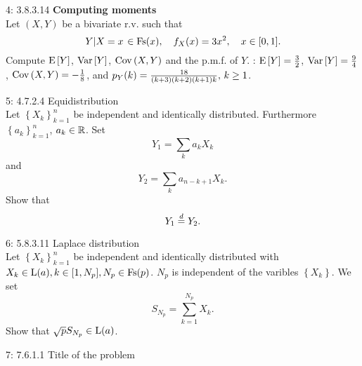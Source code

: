 \documentclass[a4paper,twoside=false,abstract=false,numbers=noenddot,
titlepage=false,headings=small,parskip=half,version=last]{scrartcl}
\begin{document}
\begin{exercise}{4: 3.8.3.14} \textbf{Computing moments} \\
    Let $(X,Y)$ be a bivariate r.v. such that
    \begin{equation}
        \left. Y \middle\vert X=x \right. \in \text{Fs}(x),\quad
        f_X(x)=3x^2,\quad
        x\in [0, 1].
    \end{equation}
    Compute ${\rm E}\,[Y]$, ${\rm Var}\,[Y]$, ${\rm Cov}\,(X, Y)$ and the p.m.f.
    of $Y$.
    \Answer:
    ${{\rm E}\,[Y]=\frac{3}{2}}$,
    ${{\rm Var}\,[Y]=\frac{9}{4}}$,
    ${{\rm Cov}\,(X,Y)=-\frac{1}{8}}$, and
    $p_{Y} (k) = \frac{18}{(k+3)(k+2)(k+1)k},\, k \ge 1$.

\end{exercise}
\begin{solution}
\end{solution}
\pagebreak

\begin{exercise}{5: 4.7.2.4} Equidistribution \\
    Let $\left\{{X_k}\right\}_{k=1}^n$ be independent and identically
    distributed. Furthermore $\left\{{a_k}\right\}_{k=1}^n$, $a_k \in \mathbb{R}$. Set
    \begin{equation}
        Y_1 = \sum\limits_k a_k X_k
    \end{equation}
    and
    \begin{equation}
        Y_2 = \sum\limits_k a_{n-k+1} X_k.
    \end{equation}
    Show that
    \begin{equation}
        Y_1 \stackrel{d}{=} Y_2.
    \end{equation}
\end{exercise}
\begin{solution}
\end{solution}
\pagebreak

\begin{exercise}{6: 5.8.3.11} Laplace distribution \\
    Let $\left\{{X_k}\right\}_{k=1}^n$ be independent and identically
    distributed with
    ${X_k \in\text{L}(a),}\, {k\in[1,N_p],}\, {N_p\in \text{Fs}(p)}$.
    $N_p$ is independent of the varibles $\left\{X_k\right\}$. We set
    \begin{equation}
        S_{N_p} = \sum\limits_{k=1}^{N_p}X_k.
    \end{equation}
    Show that $\sqrt{p}S_{N_p}\in\text{L}(a)$.
\end{exercise}
\begin{solution}
\end{solution}
\pagebreak

\begin{exercise}{7: 7.6.1.1} Title of the problem \\
\end{exercise}
\begin{solution}
\end{solution}
\pagebreak

\end{document}
